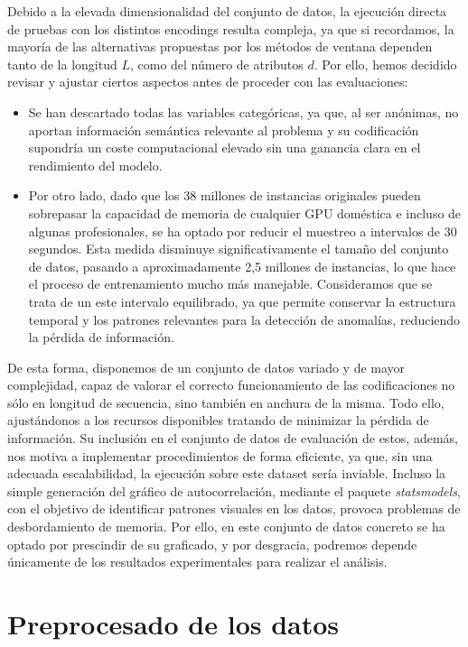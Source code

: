 Debido a la elevada dimensionalidad del conjunto de datos, la ejecución directa de pruebas con los distintos encodings resulta compleja, ya que si recordamos, la mayoría de las alternativas propuestas por los métodos de ventana dependen tanto de la longitud $L$, como del número de atributos $d$. Por ello, hemos decidido revisar y ajustar ciertos aspectos antes de proceder con las evaluaciones:

\begin{itemize}
	\item Se han descartado todas las variables categóricas, ya que, al ser anónimas, no aportan información semántica relevante al problema y su codificación supondría un coste computacional elevado sin una ganancia clara en el rendimiento del modelo.
	\item Por otro lado, dado que los 38 millones de instancias originales pueden sobrepasar la capacidad de memoria de cualquier GPU doméstica e incluso de algunas profesionales, se ha optado por reducir el muestreo a intervalos de 30 segundos. Esta medida disminuye significativamente el tamaño del conjunto de datos, pasando a aproximadamente 2,5 millones de instancias, lo que hace el proceso de entrenamiento mucho más manejable. Consideramos que se trata de un este intervalo equilibrado, ya que permite conservar la estructura temporal y los patrones relevantes para la detección de anomalías, reduciendo la pérdida de información.
\end{itemize}

De esta forma, disponemos de un conjunto de datos variado y de mayor complejidad, capaz de valorar el correcto funcionamiento de las codificaciones no sólo en longitud de secuencia, sino también en anchura de la misma. Todo ello, ajustándonos a los recursos disponibles tratando de minimizar la pérdida de información. Su inclusión en el conjunto de datos de evaluación de estos, además, nos motiva a implementar procedimientos de forma eficiente, ya que, sin una adecuada escalabilidad, la ejecución sobre este dataset sería inviable. Incluso la simple generación del gráfico de autocorrelación, mediante el paquete \textit{statsmodels}, con el objetivo de identificar patrones visuales en los datos, provoca problemas de desbordamiento de memoria. Por ello, en este conjunto de datos concreto se ha optado por prescindir de su graficado, y por desgracia, podremos depende únicamente de los resultados experimentales para realizar el análisis.

\section{Preprocesado de los datos}

